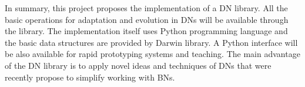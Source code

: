 In summary, this project proposes the implementation of a DN library.
All the basic operations for adaptation and evolution in DNs will be available through the library.
The implementation itself uses Python programming language and the basic data structures are provided by Darwin library.
A Python interface will be also available for rapid prototyping systems and teaching.
The main advantage of the DN library is to apply novel ideas and techniques of DNs that were recently propose to simplify working with BNs.


